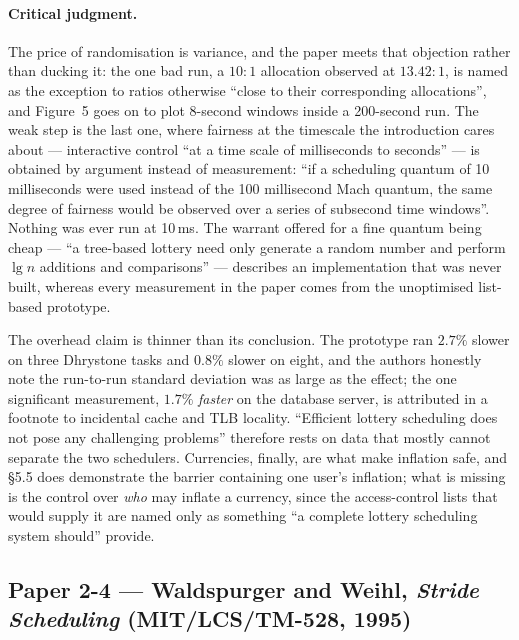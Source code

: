 \paragraph{Critical judgment.}
The price of randomisation is variance, and the paper meets that objection rather than ducking
it: the one bad run, a $10\!:\!1$ allocation observed at $13.42\!:\!1$, is named as the exception
to ratios otherwise ``close to their corresponding allocations'', and Figure~5 goes on to plot
8-second windows inside a 200-second run. The weak step is the last one, where fairness at the
timescale the introduction cares about --- interactive control ``at a time scale of milliseconds
to seconds'' --- is obtained by argument instead of measurement: ``if a scheduling quantum of 10
milliseconds were used instead of the 100 millisecond Mach quantum, the same degree of fairness
would be observed over a series of subsecond time windows''. Nothing was ever run at 10\,ms. The
warrant offered for a fine quantum being cheap --- ``a tree-based lottery need only generate a
random number and perform $\lg n$ additions and comparisons'' --- describes an implementation
that was never built, whereas every measurement in the paper comes from the unoptimised
list-based prototype.

The overhead claim is thinner than its conclusion. The prototype ran $2.7\%$ slower on three
Dhrystone tasks and $0.8\%$ slower on eight, and the authors honestly note the run-to-run
standard deviation was as large as the effect; the one significant measurement, $1.7\%$
\emph{faster} on the database server, is attributed in a footnote to incidental cache and TLB
locality. ``Efficient lottery scheduling does not pose any challenging problems'' therefore rests
on data that mostly cannot separate the two schedulers. Currencies, finally, are what make
inflation safe, and \S5.5 does demonstrate the barrier containing one user's inflation; what is
missing is the control over \emph{who} may inflate a currency, since the access-control lists
that would supply it are named only as something ``a complete lottery scheduling system should''
provide.

\subsection*{Paper 2-4 --- Waldspurger and Weihl, \emph{Stride Scheduling} (MIT/LCS/TM-528, 1995)}

